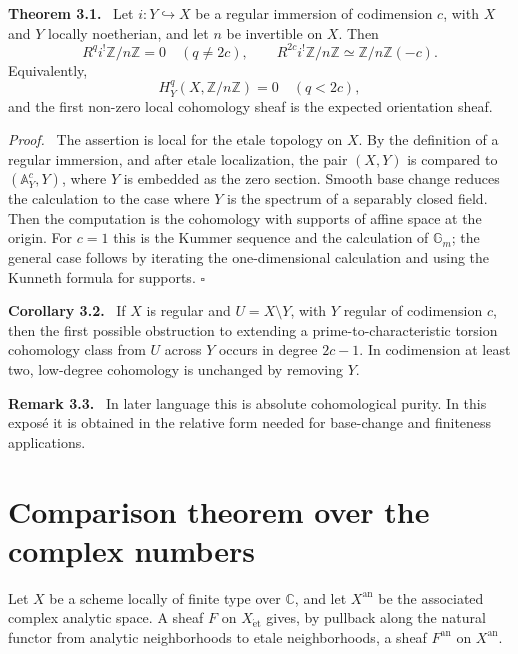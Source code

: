\documentclass[12pt]{article}
\newcommand{\Zz}{\mathbb{Z}}
\newcommand{\Cc}{\mathbb{C}}
\newcommand{\an}{\mathrm{an}}
\newcommand{\et}{\mathrm{\acute{e}t}}
\newcommand{\qedtext}{\hfill\(\square\)}
\newenvironment{statement}[1]{\par\medskip\noindent\textbf{#1.}\ }{\par\medskip}
\newenvironment{remarktext}[1]{\par\medskip\noindent\textbf{#1.}\ }{\par\medskip}
\newenvironment{prooftext}[1][Proof]{\par\noindent\emph{#1.}\ }{\par\medskip}
\begin{document}
\begin{statement}{Theorem 3.1}
Let \(i:Y\hookrightarrow X\) be a regular immersion of codimension \(c\), with \(X\) and \(Y\) locally noetherian, and let \(n\) be invertible on \(X\). Then
\[
R^qi^!\Zz/n\Zz=0\quad(q\ne 2c),
\qquad
R^{2c}i^!\Zz/n\Zz\simeq \Zz/n\Zz(-c).
\]
Equivalently,
\[
H^q_Y(X,\Zz/n\Zz)=0\quad(q<2c),
\]
and the first non-zero local cohomology sheaf is the expected orientation sheaf.
\end{statement}

\begin{prooftext}
The assertion is local for the etale topology on \(X\). By the definition of a regular immersion, and after etale localization, the pair \((X,Y)\) is compared to \((\mathbb A^c_Y,Y)\), where \(Y\) is embedded as the zero section. Smooth base change reduces the calculation to the case where \(Y\) is the spectrum of a separably closed field. Then the computation is the cohomology with supports of affine space at the origin. For \(c=1\) this is the Kummer sequence and the calculation of \(\mathbb G_m\); the general case follows by iterating the one-dimensional calculation and using the Kunneth formula for supports. \qedtext
\end{prooftext}

\begin{statement}{Corollary 3.2}
If \(X\) is regular and \(U=X\setminus Y\), with \(Y\) regular of codimension \(c\), then the first possible obstruction to extending a prime-to-characteristic torsion cohomology class from \(U\) across \(Y\) occurs in degree \(2c-1\). In codimension at least two, low-degree cohomology is unchanged by removing \(Y\).
\end{statement}

\begin{remarktext}{Remark 3.3}
In later language this is absolute cohomological purity. In this expos\'e it is obtained in the relative form needed for base-change and finiteness applications.
\end{remarktext}

\section{Comparison theorem over the complex numbers}

Let \(X\) be a scheme locally of finite type over \(\Cc\), and let \(X^{\an}\) be the associated complex analytic space. A sheaf \(F\) on \(X_{\et}\) gives, by pullback along the natural functor from analytic neighborhoods to etale neighborhoods, a sheaf \(F^{\an}\) on \(X^{\an}\).
\end{document}
